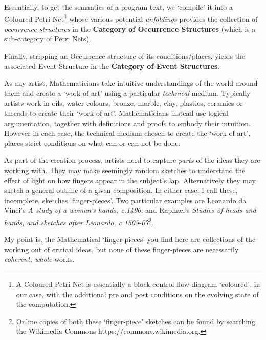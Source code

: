 Essentially, to get the semantics of a program text, we `compile' it into a
Coloured Petri Net\footnote{A Coloured Petri Net is essentially a block control
flow diagram `coloured', in our case, with the additional pre and post
conditions on the evolving state of the computation.} whose various potential
\emph{unfoldings} provides the collection of \emph{occurrence structures} in the
\textbf{Category of Occurrence Structures} (which is a sub-category of Petri
Nets).

Finally, stripping an Occurrence structure of its conditions/places, yields the
associated Event Structure in the \textbf{Category of Event Structures}.


As any artist, Mathematicians take intuitive understandings of the world around
them and create a `work of art' using a particular \emph{technical} medium.
Typically artists work in oils, water colours, bronze, marble, clay, plastics,
ceramics or threads to create their `work of art'. Mathematicians instead use
logical argumentation, together with definitions and proofs to embody their
intuition. However in each case, the technical medium chosen to create the `work
of art', places strict conditions on what can or can-not be done.

As part of the creation process, artists need to capture \emph{parts} of the
ideas they are working with. They may make seemingly random sketches to
understand the effect of light on how fingers appear in the subject's lap.
Alternatively they may sketch a general outline of a given composition. In
either case, I call these, incomplete, sketches `finger-pieces'. Two particular
examples are Leonardo da Vinci's \emph{A study of a woman's hands, c.1490}, and
Raphael's \emph{Studies of heads and hands, and sketches after Leonardo,
c.1505-07}\footnote{Online copies of both these `finger-piece' sketches can be
found by searching the Wikimedia Commons https://commons.wikimedia.org.}.

My point is, the Mathematical `finger-pieces' you find here are collections of
the working out of critical ideas, but none of these finger-pieces are
necessarily \emph{coherent, whole} works.

